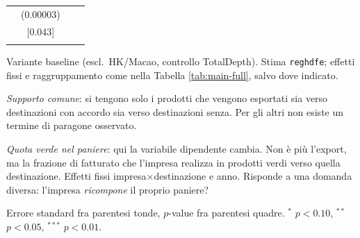 \begin{table}[htbp]
\begin{threeparttable}
\begin{tabular}{lccrc}
 & \multicolumn{2}{c}{(0.00003)} & & \\
 & \multicolumn{2}{c}{[0.043]} & & \\
\addlinespace
\bottomrule
\end{tabular}
\begin{tablenotes}[flushleft]\footnotesize
\item Variante baseline (escl.\ HK/Macao, controllo TotalDepth). Stima \texttt{reghdfe}; effetti fissi e raggruppamento come nella Tabella \ref{tab:main-full}, salvo dove indicato.
\item \textit{Supporto comune}: si tengono solo i prodotti che vengono esportati sia verso destinazioni con accordo sia verso destinazioni senza. Per gli altri non esiste un termine di paragone osservato.
\item \textit{Quota verde nel paniere}: qui la variabile dipendente cambia. Non \`e pi\`u l'export, ma la frazione di fatturato che l'impresa realizza in prodotti verdi verso quella destinazione. Effetti fissi impresa$\times$destinazione e anno. Risponde a una domanda diversa: l'impresa \emph{ricompone} il proprio paniere?
\item Errore standard fra parentesi tonde, $p$-value fra parentesi quadre. $^{*}$ $p<0.10$, $^{**}$ $p<0.05$, $^{***}$ $p<0.01$.
\end{tablenotes}
\end{threeparttable}
\end{table}
